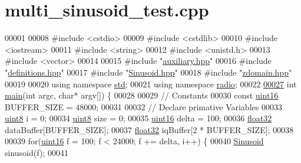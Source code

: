 \hypertarget{multi__sinusoid__test_8cpp_source}{\section{multi\+\_\+sinusoid\+\_\+test.\+cpp}
\label{multi__sinusoid__test_8cpp_source}
}

\begin{DoxyCode}
00001 
00008 \textcolor{preprocessor}{#include <cstdio>}
00009 \textcolor{preprocessor}{#include <cstdlib>}
00010 \textcolor{preprocessor}{#include <iostream>}
00011 \textcolor{preprocessor}{#include <string>}
00012 \textcolor{preprocessor}{#include <unistd.h>}
00013 \textcolor{preprocessor}{#include <vector>}
00014 
00015 \textcolor{preprocessor}{#include "\hyperlink{auxiliary_8hpp}{auxiliary.hpp}"}
00016 \textcolor{preprocessor}{#include "\hyperlink{definitions_8hpp}{definitions.hpp}"}
00017 \textcolor{preprocessor}{#include "\hyperlink{Sinusoid_8hpp}{Sinusoid.hpp}"}
00018 \textcolor{preprocessor}{#include "\hyperlink{zdomain_8hpp}{zdomain.hpp}"}
00019 
00020 \textcolor{keyword}{using namespace }\hyperlink{namespacestd}{std};
00021 \textcolor{keyword}{using namespace }\hyperlink{namespaceradio}{radio};
00022 
\hypertarget{multi__sinusoid__test_8cpp_source_l00027}{}\hyperlink{multi__sinusoid__test_8cpp_a0ddf1224851353fc92bfbff6f499fa97}{00027} \textcolor{keywordtype}{int} \hyperlink{multi__sinusoid__test_8cpp_a0ddf1224851353fc92bfbff6f499fa97}{main}(\textcolor{keywordtype}{int} argc, \textcolor{keywordtype}{char}* argv[]) \{
00028 
00029     \textcolor{comment}{// Constants}
00030     \textcolor{keyword}{const} \hyperlink{definitions_8hpp_a05f6b0ae8f6a6e135b0e290c25fe0e4e}{uint16} BUFFER\_SIZE = 48000;
00031 
00032     \textcolor{comment}{// Declare primative Variables}
00033     \hyperlink{definitions_8hpp_adde6aaee8457bee49c2a92621fe22b79}{uint8} i = 0;
00034     \hyperlink{definitions_8hpp_adde6aaee8457bee49c2a92621fe22b79}{uint8} size = 0;
00035     \hyperlink{definitions_8hpp_a05f6b0ae8f6a6e135b0e290c25fe0e4e}{uint16} delta = 100;
00036     \hyperlink{definitions_8hpp_aacdc525d6f7bddb3ae95d5c311bd06a1}{float32} dataBuffer[BUFFER\_SIZE];
00037     \hyperlink{definitions_8hpp_aacdc525d6f7bddb3ae95d5c311bd06a1}{float32} iqBuffer[2 * BUFFER\_SIZE];
00038 
00039     \textcolor{keywordflow}{for}(\hyperlink{definitions_8hpp_a05f6b0ae8f6a6e135b0e290c25fe0e4e}{uint16} f = 100; f < 24000; f += delta, i++) \{
00040         \hyperlink{classradio_1_1Sinusoid}{Sinusoid} sinusoid(f);
00041 

\end{DoxyCode}
